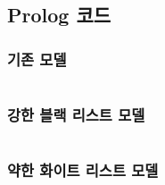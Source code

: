 \documentclass[11pt,a4paper]{article}
\begin{document}
\subsection{Prolog 코드}
\subsubsection{기존 모델}
\inputminted[fontsize=\footnotesize]{prolog}{prev_model.pl}
\subsubsection{강한 블랙 리스트 모델}
\inputminted[fontsize=\footnotesize]{prolog}{black_model.pl}
\subsubsection{약한 화이트 리스트 모델}
\inputminted[fontsize=\footnotesize]{prolog}{white_model.pl}
\end{document}
